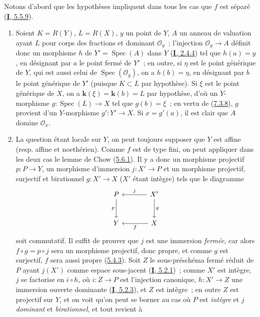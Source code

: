 Notons d'abord que les hypothèses impliquent dans tous les cas que $f$ est
séparé (\hyperref[I.5.5.9-fr]{\textbf{I}, 5.5.9}).
\begin{enumerate}
\item[\rm (i)] Soient $K=R(Y)$, $L=R(X)$, $y$ un point de $Y$, $A$ un anneau
de valuation ayant $L$ pour corps des fractions et dominant
$\mathcal{O}_y$~; l'injection $\mathcal{O}_y\to A$ définit donc un morphisme
$h$ de $Y'=\operatorname{Spec}(A)$ dans $Y$
(\hyperref[I.2.4.4-fr]{\textbf{I}, 2.4.4}) tel que $h(a)=y$, en désignant par $a$ le
point fermé de $Y'$~; en outre, si $\eta$ est le point générique de $Y$, qui
est aussi celui de $\operatorname{Spec}(\mathcal{O}_y)$, on a $h(b)=\eta$, en
désignant par $b$ le point générique de $Y'$ (puisque $K\subset L$ par
hypothèse). Si $\xi$ est le point générique de $X$, on a $\boldsymbol{k}(\xi)=\boldsymbol{k}(b)=L$ par
hypothèse, d'où un $Y$-morphisme $g:\operatorname{Spec}(L)\to X$ tel que
$g(b)=\xi$~; en vertu de (\hyperref[II.7.3.8-fr]{7.3.8}), $g$ provient d'un
$Y$-morphisme $g':Y'\to X$. Si $x=g'(a)$, il est clair que $A$ domine
$\mathcal{O}_x$.
\item[\rm (ii)] La question étant locale sur $Y$, on peut toujours supposer
que $Y$ est affine (resp. affine et noethérien). Comme $f$ est de type fini,
on peut appliquer dans les deux cas le lemme de Chow
(\hyperref[II.5.6.1-fr]{5.6.1}). Il y a donc un morphisme projectif
$p:P\to Y$, un morphisme d'immersion $j:X'\to P$ et un morphisme projectif,
surjectif et birationnel $g:X'\to X$ ($X'$ étant intègre) tels que le diagramme
\[
\begin{tikzcd}[column sep=large,row sep=large]
P \arrow[d,"p"'] & X' \arrow[l,"j"'] \arrow[d,"g"] \\
Y & X \arrow[l,"f"]
\end{tikzcd}
\]
soit commutatif. Il suffit de prouver que $j$ est une immersion \emph{fermée},
car alors $f\circ g=p\circ j$ sera un morphisme projectif, donc propre, et
comme $g$ est surjectif, $f$ sera aussi propre
(\hyperref[II.5.4.3-fr]{5.4.3}). Soit $Z$ le sous-préschéma fermé réduit de
$P$ ayant $\overline{j(X')}$ comme espace sous-jacent
(\hyperref[I.5.2.1-fr]{\textbf{I}, 5.2.1})~; comme $X'$ est intègre, $j$ se factorise
en $i\circ h$, où $i:Z\to P$ est l'injection canonique, $h:X'\to Z$ une
immersion ouverte dominante (\hyperref[I.5.2.3-fr]{\textbf{I}, 5.2.3}), et $Z$ est
intègre~;
en outre $Z$ est projectif sur $Y$, et on voit qu'on peut se borner au cas où
$P$ est \emph{intègre} et $j$ \emph{dominant} et \emph{birationnel}, et tout revient à

\end{enumerate}
